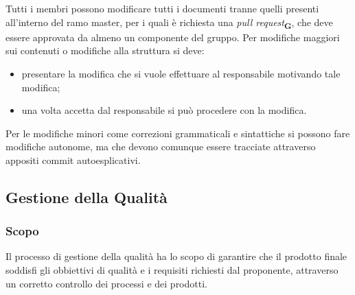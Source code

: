         Tutti i membri possono modificare tutti i documenti tranne quelli presenti all'interno del ramo master, per i quali è richiesta una \textit{pull request}\textsubscript{\textbf{G}}, che deve essere approvata da almeno un componente del gruppo.
        Per modifiche maggiori sui contenuti o modifiche alla struttura si deve:
        \begin{itemize}
            \item presentare la modifica che si vuole effettuare al responsabile motivando tale modifica;
            \item una volta accetta dal responsabile si può procedere con la modifica. 
        \end{itemize} 
        Per le modifiche minori come correzioni grammaticali e sintattiche si possono fare modifiche autonome, ma che devono comunque essere tracciate attraverso appositi commit autoesplicativi.
    \subsection{Gestione della Qualità}
        \subsubsection{Scopo}
        Il processo di gestione della qualità ha lo scopo di garantire che il prodotto finale soddisfi gli obbiettivi di qualità e i requisiti richiesti dal proponente, attraverso un corretto controllo dei processi e dei prodotti.
